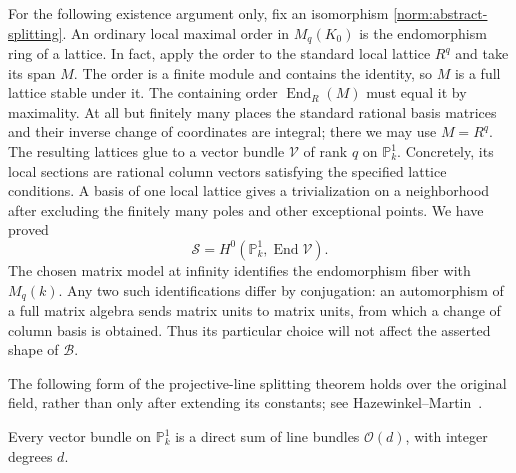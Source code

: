 For the following existence argument only, fix an isomorphism
\eqref{norm:abstract-splitting}.  An ordinary local maximal order in
$M_q(K_0)$ is the endomorphism ring of a lattice.  In fact, apply the
order to the standard local lattice $R^q$ and take its span $M$.
The order is a finite module and contains the identity, so $M$ is a
full lattice stable under it.  The containing order
$\operatorname{End}_R(M)$ must equal it by maximality.  At all but
finitely many places the standard rational basis matrices and their
inverse change of coordinates are integral; there we may use $M=R^q$.
The resulting lattices glue to a vector bundle $\mathcal V$ of rank
$q$ on $\mathbb P^1_k$.  Concretely, its local sections are rational
column vectors satisfying the specified lattice conditions.  A basis
of one local lattice gives a trivialization on a neighborhood after
excluding the finitely many poles and other exceptional points.
We have proved
\begin{equation}\label{norm:endomorphism-bundle}
 \mathcal S=H^0(\mathbb P^1_k,\operatorname{End}\mathcal V).
\end{equation}
The chosen matrix model at infinity identifies the endomorphism
fiber with $M_q(k)$.  Any two such identifications differ by
conjugation: an automorphism of a full matrix algebra sends matrix
units to matrix units, from which a change of column basis is
obtained.  Thus its particular choice will not affect the asserted
shape of $\mathcal B$.

The following form of the projective-line splitting theorem holds
over the original field, rather than only after extending its
constants; see Hazewinkel--Martin~\cite{HazewinkelMartin82}.

\begin{lemma}\label{norm:bundle-split}
Every vector bundle on $\mathbb P^1_k$ is a direct sum of line bundles
$\mathcal O(d)$, with integer degrees $d$.
\end{lemma}

